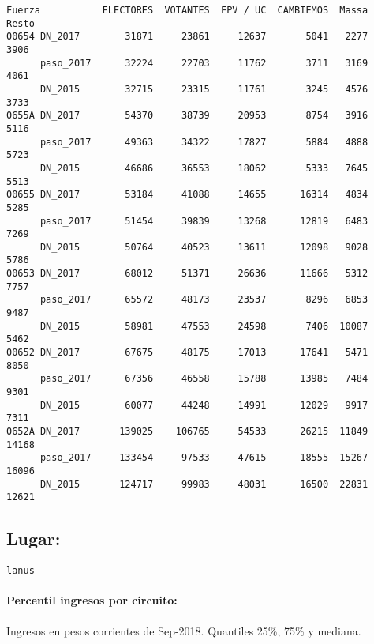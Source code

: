 \documentclass[11pt]{article}
\begin{document}
    \begin{verbatim}
Fuerza           ELECTORES  VOTANTES  FPV / UC  CAMBIEMOS  Massa  Resto
00654 DN_2017        31871     23861     12637       5041   2277   3906
      paso_2017      32224     22703     11762       3711   3169   4061
      DN_2015        32715     23315     11761       3245   4576   3733
0655A DN_2017        54370     38739     20953       8754   3916   5116
      paso_2017      49363     34322     17827       5884   4888   5723
      DN_2015        46686     36553     18062       5333   7645   5513
00655 DN_2017        53184     41088     14655      16314   4834   5285
      paso_2017      51454     39839     13268      12819   6483   7269
      DN_2015        50764     40523     13611      12098   9028   5786
00653 DN_2017        68012     51371     26636      11666   5312   7757
      paso_2017      65572     48173     23537       8296   6853   9487
      DN_2015        58981     47553     24598       7406  10087   5462
00652 DN_2017        67675     48175     17013      17641   5471   8050
      paso_2017      67356     46558     15788      13985   7484   9301
      DN_2015        60077     44248     14991      12029   9917   7311
0652A DN_2017       139025    106765     54533      26215  11849  14168
      paso_2017     133454     97533     47615      18555  15267  16096
      DN_2015       124717     99983     48031      16500  22831  12621
    \end{verbatim}

    
    \hypertarget{lugar}{%
\subsection{Lugar:}\label{lugar}}

    
    \begin{Verbatim}[commandchars=\\\{\}]
lanus

    \end{Verbatim}

    \hypertarget{percentil-ingresos-por-circuito}{%
\paragraph{Percentil ingresos por
circuito:}\label{percentil-ingresos-por-circuito}}

    
    Ingresos en pesos corrientes de Sep-2018. Quantiles 25\%, 75\% y
mediana.

    
    
\end{document}
